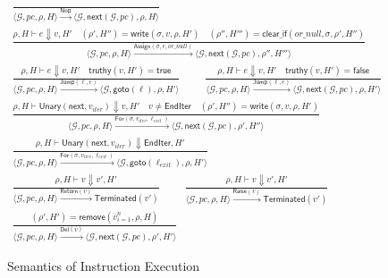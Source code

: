 \begin{figure*}[t]
\centering
\[
\begin{array}{c}
\frac{}{\langle \mathcal{G},pc,\rho,H \rangle \xrightarrow{\mathsf{Nop}} 
        \langle \mathcal{G},\mathsf{next}(\mathcal{G},pc),\rho,H \rangle}
\\[2ex]
\frac{\rho,H \vdash e \Downarrow v,H' \quad 
      (\rho',H'') = \mathsf{write}(\sigma,v,\rho,H') \quad
      (\rho'',H''') = \mathsf{clear\_if}(or\_null,\sigma,\rho',H'')}
     {\langle \mathcal{G},pc,\rho,H \rangle \xrightarrow{\mathsf{Assign}(\sigma,e,or\_null)} 
      \langle \mathcal{G},\mathsf{next}(\mathcal{G},pc),\rho'',H''' \rangle}
\\[2ex]
\frac{\rho,H \vdash e \Downarrow v,H' \quad \mathsf{truthy}(v,H') = \mathsf{true}}
     {\langle \mathcal{G},pc,\rho,H \rangle \xrightarrow{\mathsf{Jump}(\ell,e)} 
      \langle \mathcal{G},\mathsf{goto}(\ell),\rho,H' \rangle}
\qquad
\frac{\rho,H \vdash e \Downarrow v,H' \quad \mathsf{truthy}(v,H') = \mathsf{false}}
     {\langle \mathcal{G},pc,\rho,H \rangle \xrightarrow{\mathsf{Jump}(\ell,e)} 
      \langle \mathcal{G},\mathsf{next}(\mathcal{G},pc),\rho,H' \rangle}
\\[2ex]
\frac{\rho,H \vdash \mathsf{Unary}(\mathsf{next},v_{\mathit{iter}}) \Downarrow v,H' \quad
      v \neq \mathsf{EndIter} \quad
      (\rho',H'') = \mathsf{write}(\sigma,v,\rho,H')}
     {\langle \mathcal{G},pc,\rho,H \rangle \xrightarrow{\mathsf{For}(\sigma,v_{\mathit{iter}},\ell_{\mathit{exit}})} 
      \langle \mathcal{G},\mathsf{next}(\mathcal{G},pc),\rho',H'' \rangle}
\\[1.5ex]
\frac{\rho,H \vdash \mathsf{Unary}(\mathsf{next},v_{\mathit{iter}}) \Downarrow \mathsf{EndIter},H'}
     {\langle \mathcal{G},pc,\rho,H \rangle \xrightarrow{\mathsf{For}(\sigma,v_{\mathit{iter}},\ell_{\mathit{exit}})} 
      \langle \mathcal{G},\mathsf{goto}(\ell_{\mathit{exit}}),\rho,H' \rangle}
\\[2ex]
\frac{\rho,H \vdash v \Downarrow v',H'}
     {\langle \mathcal{G},pc,\rho,H \rangle \xrightarrow{\mathsf{Return}(v)} 
      \mathsf{Terminated}(v')}
\qquad
\frac{\rho,H \vdash v \Downarrow v',H'}
     {\langle \mathcal{G},pc,\rho,H \rangle \xrightarrow{\mathsf{Raise}(v)} 
      \mathsf{Terminated}(v')}
\\[2ex]
\frac{(\rho',H') = \mathsf{remove}(\overline{v}_{i=1}^{n},\rho,H)}
     {\langle \mathcal{G},pc,\rho,H \rangle \xrightarrow{\mathsf{Del}(\overline{v})} 
      \langle \mathcal{G},\mathsf{next}(\mathcal{G},pc),\rho',H' \rangle}
\end{array}
\]
\caption{Semantics of Instruction Execution}
\label{fig:instruction-semantics}
\end{figure*}

